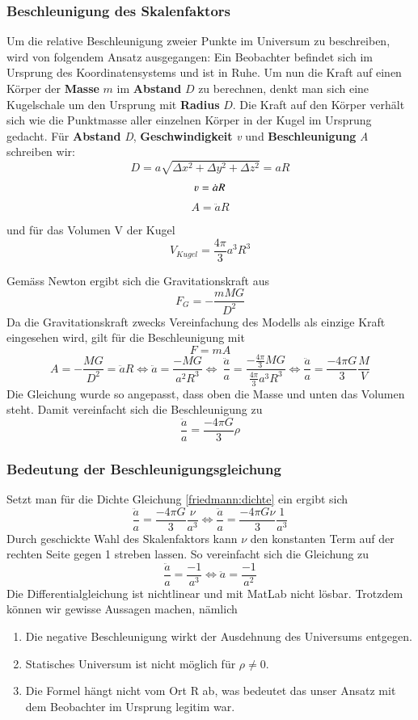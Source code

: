 \begin{refsection}
\subsubsection{Beschleunigung des Skalenfaktors}
Um die relative Beschleunigung zweier Punkte im Universum zu beschreiben, wird von folgendem Ansatz ausgegangen: Ein Beobachter befindet sich im Ursprung des Koordinatensystems und ist in Ruhe. Um nun die Kraft auf einen Körper der \textbf{Masse} $m$ im \textbf{Abstand} $D$ zu berechnen, denkt man sich eine Kugelschale um den Ursprung mit \textbf{Radius} $D$. Die Kraft auf den Körper verhält sich wie die Punktmasse aller  einzelnen Körper in der Kugel im Ursprung gedacht.
Für \textbf{Abstand} \textit{D}, \textbf{Geschwindigkeit} \textit{v} und \textbf{Beschleunigung} \textit{A} schreiben wir:
\[D =  a \sqrt{\Delta x^2 + \Delta y^2 + \Delta z^2}  = a R\]
\[\varv = \dot{a} R\]
\[A = \ddot{a} R\]

und für das Volumen V der Kugel
\[V_{Kugel} = \frac{4 \pi }{3} a^3 R^3\]

Gemäss Newton ergibt sich die Gravitationskraft aus
\begin{equation}
F_G = -\frac{m M G}{D^2}
\end{equation}
Da die Gravitationskraft zwecks Vereinfachung des Modells als einzige Kraft eingesehen wird, gilt für die Beschleunigung mit 
\[F = m A\]
\[A = - \frac{M G}{D^2} = \ddot{a} R \Leftrightarrow \ddot{a} = \frac{- M G}{a^2 R^3} \Leftrightarrow\ \frac{\ddot{a}}{a} = \frac{-\frac{4 \pi }{3} M G}{\frac{4 \pi}{3}a^3 R^3} \Leftrightarrow \frac{\ddot{a}}{a} = \frac{- 4 \pi G}{3} \frac{M}{V}\]
Die Gleichung wurde so angepasst, dass oben die Masse und unten das Volumen steht. Damit vereinfacht sich die Beschleunigung zu
\begin{equation}
\frac{\ddot{a}}{a} = \frac{- 4 \pi G}{3} \rho
\end{equation}
\subsubsection{Bedeutung der Beschleunigungsgleichung}
Setzt man für die Dichte Gleichung \ref{friedmann:dichte} ein ergibt sich
\[\frac{\ddot{a}}{a} = \frac{- 4 \pi G}{3} \frac{\nu}{a^3} \Leftrightarrow \frac{\ddot{a}}{a} = \frac{- 4 \pi G \nu}{3} \frac{1}{a^3}\]
Durch geschickte Wahl des Skalenfaktors kann $\nu$ den konstanten Term auf der rechten Seite gegen 1 streben lassen. So vereinfacht sich die Gleichung zu
\[\frac{\ddot{a}}{a} = \frac{-1}{a^3} \Leftrightarrow \ddot{a} = \frac{-1}{a^2}\]
Die Differentialgleichung ist nichtlinear und mit MatLab nicht lösbar. Trotzdem können wir gewisse Aussagen machen, nämlich
\begin{enumerate}
	\item Die negative Beschleunigung wirkt der Ausdehnung des Universums entgegen. 
	\item Statisches Universum ist nicht möglich für $\rho \neq 0$.
	\item Die Formel hängt nicht vom Ort R ab, was bedeutet das unser Ansatz mit dem Beobachter im Ursprung legitim war.
\end{enumerate}


\end{refsection}
